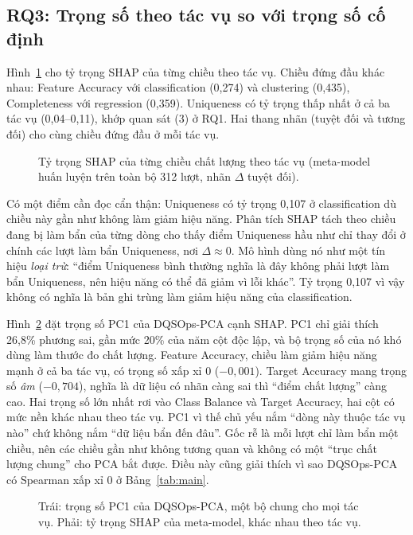 \subsection{RQ3: Trọng số theo tác vụ so với trọng số cố định}
\label{sec:rq3}

Hình~\ref{fig:h8} cho tỷ trọng SHAP của từng chiều theo tác vụ. Chiều đứng đầu khác nhau: Feature Accuracy với classification (0,274) và clustering (0,435), Completeness với regression (0,359). Uniqueness có tỷ trọng thấp nhất ở cả ba tác vụ (0,04--0,11), khớp quan sát (3) ở RQ1. Hai thang nhãn (tuyệt đối và tương đối) cho cùng chiều đứng đầu ở mỗi tác vụ.

\begin{figure}[ht]
\centering
{}
\caption{Tỷ trọng SHAP của từng chiều chất lượng theo tác vụ (meta-model huấn luyện trên toàn bộ 312 lượt, nhãn $\Delta$ tuyệt đối).}
\label{fig:h8}
\end{figure}

Có một điểm cần đọc cẩn thận: Uniqueness có tỷ trọng 0,107 ở classification dù chiều này gần như không làm giảm hiệu năng. Phân tích SHAP tách theo chiều đang bị làm bẩn của từng dòng cho thấy điểm Uniqueness hầu như chỉ thay đổi ở chính các lượt làm bẩn Uniqueness, nơi $\Delta \approx 0$. Mô hình dùng nó như một tín hiệu \emph{loại trừ}: ``điểm Uniqueness bình thường nghĩa là đây không phải lượt làm bẩn Uniqueness, nên hiệu năng có thể đã giảm vì lỗi khác''. Tỷ trọng 0,107 vì vậy không có nghĩa là bản ghi trùng làm giảm hiệu năng của classification.

Hình~\ref{fig:h9} đặt trọng số PC1 của DQSOps-PCA cạnh SHAP. PC1 chỉ giải thích 26,8\% phương sai, gần mức 20\% của năm cột độc lập, và bộ trọng số của nó khó dùng làm thước đo chất lượng. Feature Accuracy, chiều làm giảm hiệu năng mạnh ở cả ba tác vụ, có trọng số xấp xỉ 0 ($-0{,}001$). Target Accuracy mang trọng số \emph{âm} ($-0{,}704$), nghĩa là dữ liệu có nhãn càng sai thì ``điểm chất lượng'' càng cao. Hai trọng số lớn nhất rơi vào Class Balance và Target Accuracy, hai cột có mức nền khác nhau theo tác vụ. PC1 vì thế chủ yếu nắm ``dòng này thuộc tác vụ nào'' chứ không nắm ``dữ liệu bẩn đến đâu''. Gốc rễ là mỗi lượt chỉ làm bẩn một chiều, nên các chiều gần như không tương quan và không có một ``trục chất lượng chung'' cho PCA bắt được. Điều này cũng giải thích vì sao DQSOps-PCA có Spearman xấp xỉ 0 ở Bảng~\ref{tab:main}.

\begin{figure}[ht]
\centering
{}
\caption{Trái: trọng số PC1 của DQSOps-PCA, một bộ chung cho mọi tác vụ. Phải: tỷ trọng SHAP của meta-model, khác nhau theo tác vụ.}
\label{fig:h9}
\end{figure}

